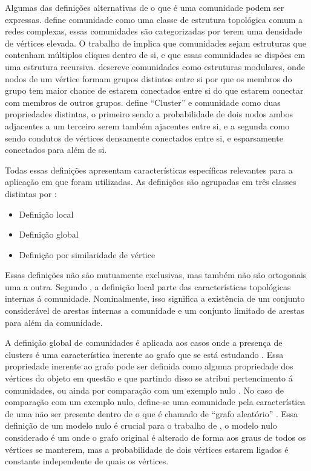 \documentclass[notes.tex]{subfiles}
\begin{document}
Algumas das definições alternativas de o que é uma comunidade podem ser expressas.
 define comunidade como uma classe de estrutura topológica comum a redes complexas, essas comunidades são categorizadas por terem uma densidade de vértices elevada.
O trabalho de  implica que comunidades sejam estruturas que contenham múltiplos cliques dentro de si, e que essas comunidades se dispões em uma estrutura recursiva.
 descreve comunidades como estruturas modulares, onde nodos de um vértice formam grupos distintos entre si por que os membros do grupo tem maior chance de estarem conectados entre si do que estarem conectar com membros de outros grupos.
 define ``Cluster'' e comunidade como duas propriedades distintas, o primeiro sendo a probabilidade de dois nodos ambos adjacentes a um terceiro serem também ajacentes entre si, e a segunda como sendo condutos de vértices densamente conectados entre si, e esparsamente conectados para além de si.

Todas essas definições apresentam características específicas relevantes para a aplicação em que foram utilizadas.
As definições são agrupadas em três classes distintas por :

\begin{itemize}
    \item Definição local
    \item Definição global
    \item Definição por similaridade de vértice
\end{itemize}

Essas definições não são mutuamente exclusivas, mas também não são ortogonais uma a outra.
Segundo , a definição local parte das características topológicas internas á comunidade.
Nominalmente, isso significa a existência de um conjunto considerável de arestas internas a comunidade e um conjunto limitado de arestas para além da comunidade.

A definição global de comunidades é aplicada aos casos onde a presença de clusters é uma característica inerente ao grafo que se está estudando .
Essa propriedade inerente ao grafo pode ser definida como alguma propriedade dos vértices do objeto em questão e que partindo disso se atribui pertencimento á comunidades, ou ainda por comparação com um exemplo nulo .
No caso de comparação com um exemplo nulo, define-se uma comunidade pela característica de uma não ser presente dentro de o que é chamado de ``grafo aleatório'' \cite{fortunato2010community}.
Essa definição de um modelo nulo é crucial para o trabalho de , o modelo nulo considerado é um onde o grafo original é alterado de forma aos graus de todos os vértices se manterem, mas a probabilidade de dois vértices estarem ligados é constante independente de quais os vértices.
\end{document}
